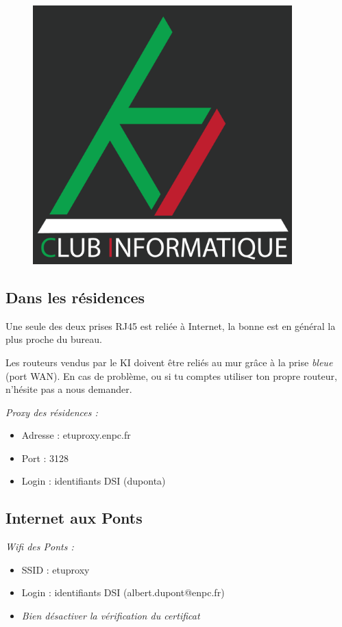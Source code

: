 \documentclass{ki019}
\begin{document}
    \begin{figure}[H]
      \centering
      \includegraphics[width=10cm]{page2}
    \end{figure}

    \vspace{2cm}
    \begin{kiframe}
      \subsection{Dans les résidences} %
        Une seule des deux prises RJ45 est reliée à Internet, la bonne est en général la plus proche du bureau.

        Les routeurs vendus par le KI doivent être reliés au mur grâce à la prise \emph{bleue} (port WAN). En cas de problème, ou si tu comptes utiliser ton propre routeur, n'hésite pas a nous demander.

        \begin{flushleft}
          \emph{Proxy des résidences :}
          \begin{itemize}
            \item Adresse : etuproxy.enpc.fr
            \item Port : 3128
            \item Login : identifiants DSI (duponta)
          \end{itemize}
        \end{flushleft}

      \subsection{Internet aux Ponts}
        \begin{flushleft}
          \emph{Wifi des Ponts :}
          \begin{itemize}
            \item SSID : etuproxy
            \item Login : identifiants DSI (albert.dupont@enpc.fr)
            \item \emph{Bien désactiver la vérification du certificat}
          \end{itemize}
        \end{flushleft}
      \end{kiframe}
\end{document}
